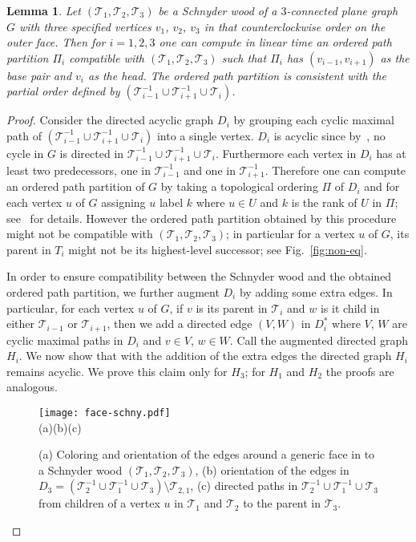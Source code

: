 \documentclass{article}
\newtheorem{lemma}[theorem]{Lemma}
\newcommand{\TT}{{\mathcal{T}}}
\begin{document}
\begin{lemma}
\label{lem:schny-can}
Let $(\TT_1, \TT_2, \TT_3)$ be a Schnyder wood of a $3$-connected plane graph
$G$ with three specified vertices $v_1$, $v_2$, $v_3$ in that counterclockwise order on the outer face.
Then for $i=1,2,3$ one can compute in linear time an ordered path partition $\Pi_i$ compatible with
$(\TT_1, \TT_2, \TT_3)$ such that $\Pi_i$ has $(v_{i-1}, v_{i+1})$ as the base pair and $v_i$ as the head.
The ordered path partition is consistent with the partial order defined by
$(\TT_{i-1}^{-1}\cup \TT_{i+1}^{-1}\cup \TT_{i})$.
\end{lemma}
\begin{proof}
Consider the directed acyclic graph $D_i$ by grouping each cyclic maximal path of
 $(\TT_{i-1}^{-1}\cup \TT_{i+1}^{-1}\cup \TT_{i})$ into a single vertex.
$D_i$ is acyclic since by~\cite{FZ08}, no cycle in $G$ is directed in
 $\TT_{i-1}^{-1}\cup \TT_{i+1}^{-1}\cup \TT_{i}$.
 Furthermore each vertex in $D_i$ has at least two predecessors, one in $\TT_{i-1}^{-1}$ and one in
 $\TT_{i+1}^{-1}$. Therefore one can compute an ordered path partition of $G$ by taking a topological
 ordering $\Pi$ of $D_i$ and for each vertex $u$ of $G$ assigning $u$ label $k$ where $u\in U$ and
 $k$ is the rank of $U$ in $\Pi$; see~\cite{BBC11} for details. However the ordered path partition obtained
 by this procedure might not be compatible with $(\TT_1, \TT_2, \TT_3)$; in particular for a vertex $u$ of
 $G$, its parent in $T_i$ might not be its highest-level successor; see Fig.~\ref{fig:non-eq}.


 In order to ensure compatibility between
 the Schnyder wood and the obtained ordered path partition, we further augment $D_i$ by adding some
 extra edges. In particular, for each vertex $u$ of $G$, if $v$ is its parent in $\TT_i$ and $w$ is it child in
 either $\TT_{i-1}$ or $\TT_{i+1}$, then we add a directed edge $(V,W)$ in $D^*_i$ where $V$, $W$ are
 cyclic maximal paths in $D_i$ and $v\in V$, $w\in W$. Call the augmented directed graph $H_i$.
 We now show that with the addition of the extra edges the directed graph $H_i$ remains acyclic.
 We prove this claim only for $H_3$; for $H_1$ and $H_2$ the proofs are analogous.


\begin{figure}[t]
\centering
\texttt{[image: face-schny.pdf]}\\
(a)\hspace{0.27\textwidth}(b)\hspace{0.27\textwidth}(c)\hspace{0.05\textwidth}
\caption{(a) Coloring and orientation of the edges around a generic face in to a Schnyder wood
 $(\TT_1, \TT_2, \TT_3)$, (b) orientation of the edges in
 $D_3=(\TT_{2}^{-1}\cup \TT_{1}^{-1}\cup \TT_{3})\setminus\TT_{2,1}$, (c) directed paths in
 $\TT_{2}^{-1}\cup \TT_{1}^{-1}\cup \TT_{3}$ from children of a vertex $u$ in $\TT_1$ and $\TT_2$
 to the parent in $\TT_3$.}
\label{fig:face-schny}
\end{figure}



\end{proof}
\end{document}
